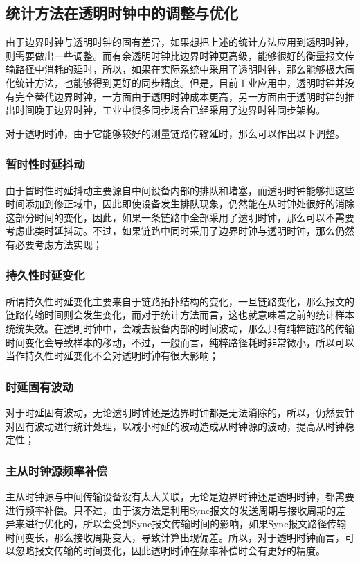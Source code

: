 \subsection{统计方法在透明时钟中的调整与优化}
由于边界时钟与透明时钟的固有差异，如果想把上述的统计方法应用到透明时钟，则需要做出一些调整。而有余透明时钟比边界时钟更高级，能够很好的衡量报文传输路径中消耗的延时，所以，如果在实际系统中采用了透明时钟，那么能够极大简化统计方法，也能够得到更好的同步精度。但是，目前工业应用中，透明时钟并没有完全替代边界时钟，一方面由于透明时钟成本更高，另一方面由于透明时钟的推出时间晚于边界时钟，工业中很多同步场合已经采用了边界时钟同步架构。

对于透明时钟，由于它能够较好的测量链路传输延时，那么可以作出以下调整。
\subsubsection{暂时性时延抖动}
由于暂时性时延抖动主要源自中间设备内部的排队和堵塞，而透明时钟能够把这些时间添加到修正域中，因此即使设备发生排队现象，仍然能在从时钟处很好的消除这部分时间的变化，因此，如果一条链路中全部采用了透明时钟，那么可以不需要考虑此类时延抖动。不过，如果链路中同时采用了边界时钟与透明时钟，那么仍然有必要考虑方法实现；

\subsubsection{持久性时延变化}
所谓持久性时延变化主要来自于链路拓扑结构的变化，一旦链路变化，那么报文的链路传输时间则会发生变化，而对于统计方法而言，这也就意味着之前的统计样本统统失效。在透明时钟中，会减去设备内部的时间波动，那么只有纯粹链路的传输时间变化会导致样本的移动，不过，一般而言，纯粹路径耗时非常微小，所以可以当作持久性时延变化不会对透明时钟有很大影响；

\subsubsection{时延固有波动}
对于时延固有波动，无论透明时钟还是边界时钟都是无法消除的，所以，仍然要针对固有波动进行统计处理，以减小时延的波动造成从时钟源的波动，提高从时钟稳定性；

\subsubsection{主从时钟源频率补偿}
主从时钟源与中间传输设备没有太大关联，无论是边界时钟还是透明时钟，都需要进行频率补偿。只不过，由于该方法是利用Sync报文的发送周期与接收周期的差异来进行优化的，所以会受到Sync报文传输时间的影响，如果Sync报文路径传输时间变长，那么接收周期变大，导致计算出现偏差。所以，对于透明时钟而言，可以忽略报文传输的时间变化，因此透明时钟在频率补偿时会有更好的精度。

